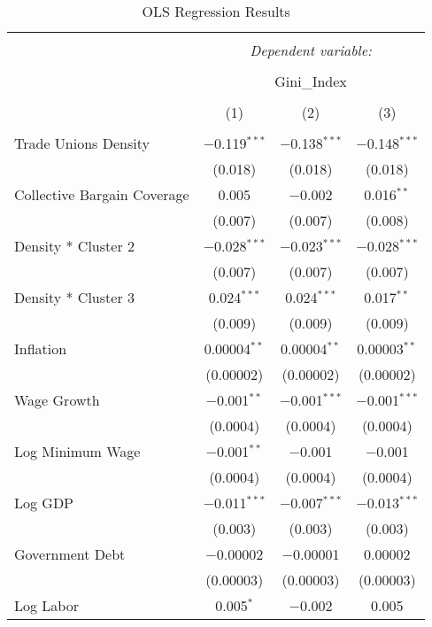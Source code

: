 
\begin{table}[!htbp] \centering 
  \caption{OLS Regression Results} 
  \label{} 
\begin{tabular}{@{\extracolsep{5pt}}lccc} 
\\[-1.8ex]\hline 
\hline \\[-1.8ex] 
 & \multicolumn{3}{c}{\textit{Dependent variable:}} \\ 
\cline{2-4} 
\\[-1.8ex] & \multicolumn{3}{c}{Gini\_Index} \\ 
\\[-1.8ex] & (1) & (2) & (3)\\ 
\hline \\[-1.8ex] 
 Trade Unions Density & $-$0.119$^{***}$ & $-$0.138$^{***}$ & $-$0.148$^{***}$ \\ 
  & (0.018) & (0.018) & (0.018) \\ 
  Collective Bargain Coverage & 0.005 & $-$0.002 & 0.016$^{**}$ \\ 
  & (0.007) & (0.007) & (0.008) \\ 
  Density * Cluster 2 & $-$0.028$^{***}$ & $-$0.023$^{***}$ & $-$0.028$^{***}$ \\ 
  & (0.007) & (0.007) & (0.007) \\ 
  Density * Cluster 3 & 0.024$^{***}$ & 0.024$^{***}$ & 0.017$^{**}$ \\ 
  & (0.009) & (0.009) & (0.009) \\ 
  Inflation & 0.00004$^{**}$ & 0.00004$^{**}$ & 0.00003$^{**}$ \\ 
  & (0.00002) & (0.00002) & (0.00002) \\ 
  Wage Growth & $-$0.001$^{**}$ & $-$0.001$^{***}$ & $-$0.001$^{***}$ \\ 
  & (0.0004) & (0.0004) & (0.0004) \\ 
  Log Minimum Wage & $-$0.001$^{**}$ & $-$0.001 & $-$0.001 \\ 
  & (0.0004) & (0.0004) & (0.0004) \\ 
  Log GDP & $-$0.011$^{***}$ & $-$0.007$^{***}$ & $-$0.013$^{***}$ \\ 
  & (0.003) & (0.003) & (0.003) \\ 
  Government Debt & $-$0.00002 & $-$0.00001 & 0.00002 \\ 
  & (0.00003) & (0.00003) & (0.00003) \\ 
  Log Labor & 0.005$^{*}$ & $-$0.002 & 0.005 \\ 

\end{tabular}
\end{table}
